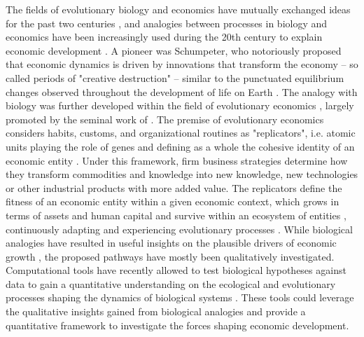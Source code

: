   The fields of evolutionary biology and economics have mutually exchanged ideas for the past two centuries \citep{Dopfer2007}, and analogies between processes in biology and economics have been increasingly used during the 20th century to explain economic development \citep{Ruth1996}.
  A pioneer was Schumpeter, who notoriously proposed that economic dynamics is driven by innovations that transform the economy -- so called periods of "creative destruction" \citep{schumpeter2017theory}-- similar to the punctuated equilibrium changes observed throughout the development of life on Earth \citep{gould1972}.
  The analogy with biology was further developed within the field of evolutionary economics \citep{Hodgson2019}, largely promoted by the seminal work of \cite{nelson1985evolutionary}.
  The premise of evolutionary economics considers habits, customs, and organizational routines as "replicators", i.e. atomic units playing the role of genes and defining as a whole the cohesive identity of an economic entity \citep{Hodgson2019}.
  Under this framework, firm business strategies determine how they transform commodities and knowledge into new knowledge, new technologies or other industrial products with more added value.
  The replicators define the fitness of an economic entity within a given economic context, which grows in terms of assets and human capital and survive within an ecosystem of entities \citep{Hodgson2002}, continuously adapting and experiencing evolutionary processes \citep{Veblen1898}.
  While biological analogies have resulted in useful insights on the plausible drivers of economic growth \citep{Dopfer2007}, the proposed pathways have mostly been qualitatively investigated.
  Computational tools have recently allowed to test biological hypotheses against data to gain a quantitative understanding on the ecological and evolutionary processes shaping the dynamics of biological systems \citep{Pontarp2019,Boussange2022,Boussange2022a}. These tools could leverage the qualitative insights gained from biological analogies and provide a quantitative framework to investigate the forces shaping economic development.
  
